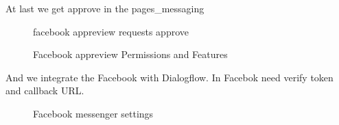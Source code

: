 \documentclass[12pt,oneside,openright,a4paper]{cpe-english-project}
\begin{document}
		\begin{flushleft}
			At last we get approve in the pages\_messaging
		\end{flushleft}
		\begin{figure}[!h]\centering
			\caption{facebook appreview requests approve}\label{fig:facebook appreview requests approve}
			\caption{Facebook appreview Permissions and Features}\label{fig:Facebook appreview Permissions and Features}
		\end{figure}
		
		\begin{flushleft}
			And we integrate the Facebook with Dialogflow. In Facebok need verify token and callback URL.
		\end{flushleft}
		\begin{figure}[!h]\centering
			\caption{Facebook messenger settings}\label{fig:Facebook messenger settings}
		\end{figure}
\end{document}
